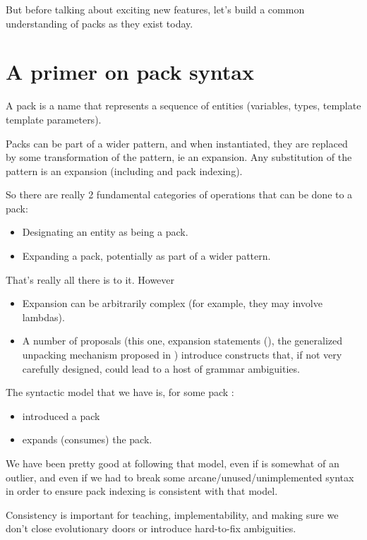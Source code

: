 \documentclass{wg21}
\begin{document}
But before talking about exciting new features, let's build a common understanding of packs as they exist today.

\section{A primer on pack syntax}

A pack is a name that represents a sequence of entities (variables, types, template template parameters).

Packs can be part of a wider pattern, and when instantiated, they are replaced by some transformation of the pattern, ie an expansion.
Any substitution of the pattern is an expansion (including  and pack indexing).

So there are really 2 fundamental categories of operations that can be done to a pack:
\begin{itemize}
\item Designating an entity as being a pack.
\item Expanding a pack, potentially as part of a wider pattern.
\end{itemize}

That's really all there is to it.  However
\begin{itemize}
\item Expansion can be arbitrarily complex (for example, they may involve lambdas).
\item A number of proposals (this one, expansion statements (), the generalized unpacking mechanism proposed in ) introduce
constructs that, if not very carefully designed, could lead to a host of grammar ambiguities.
\end{itemize}

The syntactic model that we have is, for some pack :

\begin{itemize}
\item {} introduced a pack
\item {} expands (consumes) the pack.
\end{itemize}

We have been pretty good at following that model, even if  is somewhat of an outlier,
and even if we had to break some arcane/unused/unimplemented syntax in order to ensure pack indexing is consistent with that model.

Consistency is important for teaching, implementability, and making sure we don't close evolutionary doors or introduce hard-to-fix ambiguities.
\end{document}
